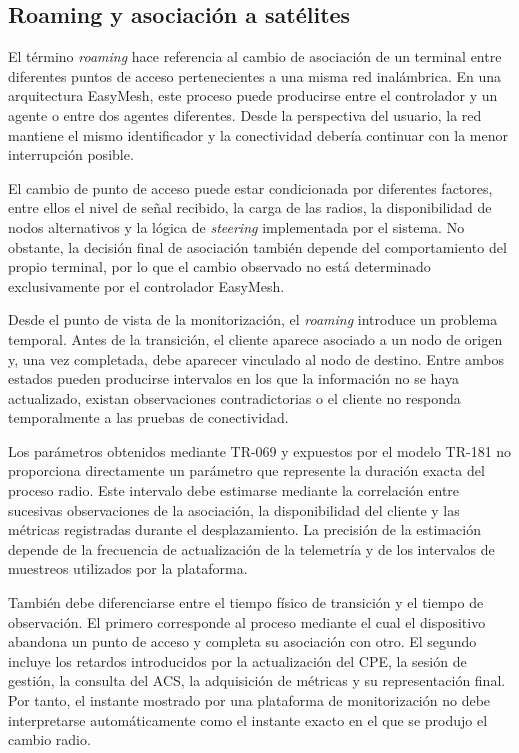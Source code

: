 \subsection{Roaming y asociación a satélites}
\label{subsec:roaming-asociacion}

El término \textit{roaming} hace referencia al 
cambio de asociación de un terminal entre diferentes 
puntos de acceso pertenecientes a una misma red inalámbrica. 
En una arquitectura EasyMesh, este proceso puede producirse entre el controlador 
y un agente o entre dos agentes diferentes. Desde la perspectiva del usuario, 
la red mantiene el mismo identificador 
y la conectividad debería continuar con la menor interrupción posible.

El cambio de punto de acceso puede estar condicionada por diferentes factores, 
entre ellos el nivel de señal recibido, la carga de las radios, 
la disponibilidad de nodos alternativos 
y la lógica de \textit{steering} implementada por el sistema. 
No obstante, la decisión final de asociación también depende 
del comportamiento del propio terminal, 
por lo que el cambio observado no está determinado exclusivamente por el controlador EasyMesh.

Desde el punto de vista de la monitorización, 
el \textit{roaming} introduce un problema temporal. 
Antes de la transición, el cliente aparece asociado a un nodo de origen y,
una vez completada, debe aparecer vinculado al nodo de destino. 
Entre ambos estados pueden producirse intervalos 
en los que la información no se haya actualizado, 
existan observaciones contradictorias o el cliente no responda 
temporalmente a las pruebas de conectividad.

Los parámetros obtenidos mediante TR-069 y 
expuestos por el modelo TR-181 no proporciona directamente 
un parámetro que represente la duración exacta del proceso radio. 
Este intervalo debe estimarse mediante la correlación 
entre sucesivas observaciones de la asociación, 
la disponibilidad del cliente y las métricas registradas 
durante el desplazamiento. 
La precisión de la estimación depende de la frecuencia de actualización 
de la telemetría y de los intervalos de muestreos utilizados por la plataforma.

También debe diferenciarse entre el tiempo físico de transición 
y el tiempo de observación. 
El primero corresponde al proceso mediante el cual el dispositivo abandona 
un punto de acceso y completa su asociación con otro. 
El segundo incluye los retardos introducidos por la actualización del CPE, 
la sesión de gestión, la consulta del ACS, la adquisición de métricas 
y su representación final. Por tanto, 
el instante mostrado por una plataforma de monitorización 
no debe interpretarse automáticamente como el instante exacto en el 
que se produjo el cambio radio.

